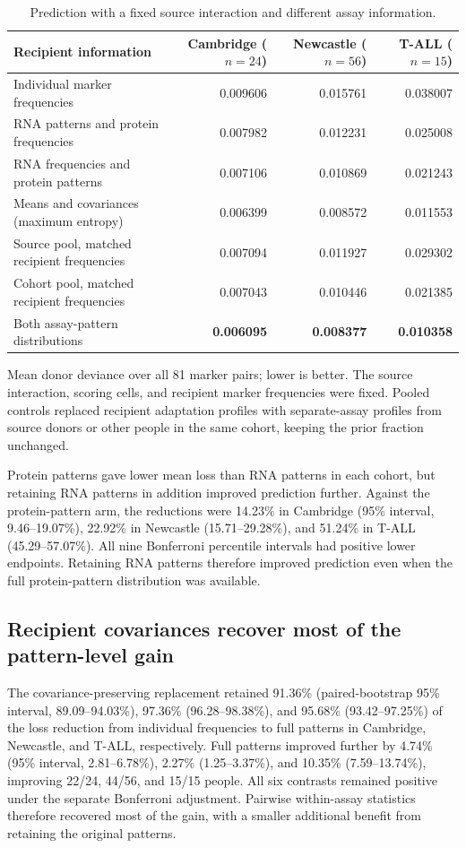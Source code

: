 \documentclass[pdflatex,sn-vancouver-num,iicol]{sn-jnl}
\begin{document}
\begin{table}[t]
\caption{Prediction with a fixed source interaction and different assay information.}
\label{tab:resolution}
\centering\small
\begin{tabular*}{\textwidth}{@{\extracolsep\fill}lrrr@{}}
\toprule
Recipient information & Cambridge ($n=24$) & Newcastle ($n=56$) & T-ALL ($n=15$)\\
\midrule
Individual marker frequencies & 0.009606 & 0.015761 & 0.038007\\
RNA patterns and protein frequencies & 0.007982 & 0.012231 & 0.025008\\
RNA frequencies and protein patterns & 0.007106 & 0.010869 & 0.021243\\
Means and covariances (maximum entropy) & 0.006399 & 0.008572 & 0.011553\\
Source pool, matched recipient frequencies & 0.007094 & 0.011927 & 0.029302\\
Cohort pool, matched recipient frequencies & 0.007043 & 0.010446 & 0.021385\\
Both assay-pattern distributions & \textbf{0.006095} & \textbf{0.008377} & \textbf{0.010358}\\
\bottomrule
\end{tabular*}
\par\smallskip\parbox{\textwidth}{\footnotesize Mean donor deviance over all 81 marker pairs;
lower is better. The source interaction, scoring cells, and recipient marker
frequencies were fixed. Pooled controls replaced recipient adaptation profiles
with separate-assay profiles from source donors or other people in the same
cohort, keeping the prior fraction unchanged.}
\end{table}

Protein patterns gave lower mean loss than RNA patterns in each cohort, but
retaining RNA patterns in addition improved prediction further. Against the
protein-pattern arm, the reductions were 14.23\% in Cambridge (95\% interval,
9.46--19.07\%), 22.92\% in Newcastle (15.71--29.28\%), and 51.24\% in T-ALL
(45.29--57.07\%). All nine Bonferroni percentile intervals had positive lower
endpoints. Retaining RNA patterns therefore improved prediction even when the
full protein-pattern distribution was available.

\subsection{Recipient covariances recover most of the pattern-level gain}
The covariance-preserving replacement retained 91.36\% (paired-bootstrap
95\% interval, 89.09--94.03\%), 97.36\% (96.28--98.38\%), and 95.68\%
(93.42--97.25\%) of the loss reduction from individual frequencies to full
patterns in Cambridge, Newcastle, and T-ALL, respectively. Full patterns improved further
by 4.74\% (95\% interval, 2.81--6.78\%), 2.27\% (1.25--3.37\%), and 10.35\%
(7.59--13.74\%), improving 22/24, 44/56, and 15/15 people. All six contrasts
remained positive under the separate Bonferroni adjustment. Pairwise
within-assay statistics therefore recovered most of the gain, with a smaller
additional benefit from retaining the original patterns.
\end{document}

